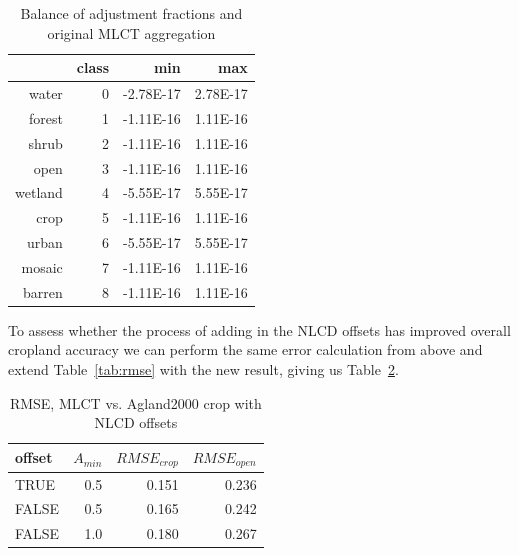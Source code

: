 \begin{table}[ht]
\begin{center}
\begin{tabular}{rrrr}
  \hline
 & class & min & max \\ 
  \hline
water & 0 & -2.78E-17 & 2.78E-17 \\ 
  forest & 1 & -1.11E-16 & 1.11E-16 \\ 
  shrub & 2 & -1.11E-16 & 1.11E-16 \\ 
  open & 3 & -1.11E-16 & 1.11E-16 \\ 
  wetland & 4 & -5.55E-17 & 5.55E-17 \\ 
  crop & 5 & -1.11E-16 & 1.11E-16 \\ 
  urban & 6 & -5.55E-17 & 5.55E-17 \\ 
  mosaic & 7 & -1.11E-16 & 1.11E-16 \\ 
  barren & 8 & -1.11E-16 & 1.11E-16 \\ 
   \hline
\end{tabular}
\caption{Balance of adjustment fractions and original MLCT aggregation}
\label{tab:restack_check}
\end{center}
\end{table}
To assess whether the process of adding in the NLCD offsets has
improved overall cropland accuracy we can perform the same error
calculation from above and extend Table~\ref{tab:rmse} with the new
result, giving us Table~\ref{tab:rmse2}.

\begin{table}[ht]
\begin{center}
\begin{tabular}{lrrr}
  \hline
offset & $A_{min}$ & $RMSE_{crop}$ & $RMSE_{open}$ \\ 
  \hline
TRUE & 0.5 & 0.151 & 0.236 \\ 
  FALSE & 0.5 & 0.165 & 0.242 \\ 
  FALSE & 1.0 & 0.180 & 0.267 \\ 
   \hline
\end{tabular}
\caption{RMSE, MLCT vs. Agland2000 crop with NLCD offsets}
\label{tab:rmse2}
\end{center}
\end{table}

